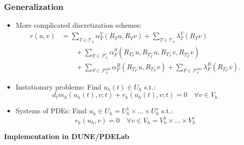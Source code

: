 \documentclass[ignorenonframetext,11pt]{beamer}
\theoremstyle{definition}
\begin{document}
\begin{frame}
\frametitle{Generalization}
\begin{itemize}
\item More complicated discretization schemes:
\begin{equation*}
\begin{split}
r(u,v) &= 
\sum_{T\in\mathcal{T}_h} \alpha_T^V(R_T u, R_T v) 
+ \sum_{T\in\mathcal{T}_h} \lambda_T^V(R_T v) \\
&\qquad+ \sum_{F\in\mathcal{F}_h^i} \alpha_F^S(R_{T_F^-} u,R_{T_F^+} u, R_{T_F^-} v, R_{T_F^+} v)\\
&\qquad+ \sum_{F\in\mathcal{F}_h^{\partial\Omega}} \alpha_F^B(R_{T_F^-} u, R_{T_F^-} v)
+ \sum_{F\in\mathcal{F}_h^{\partial\Omega}} \lambda_F^B(R_{T_F^-} v) .
\end{split}
\end{equation*}
\item Instationary problems: Find $u_h(t)\in U_h$ s.t.:
\begin{equation*}
d_t m_h(u_h(t),v;t) + r_h(u_h(t),v;t) = 0 
\quad \forall v\in V_h
\end{equation*}
\item Systems of PDEs: Find $u_h\in U_h=U_h^1\times \ldots \times U_h^s$ s.t.:
\begin{equation*}
r_h(u_h,v)=0 
\quad \forall v\in V_h=V_h^1\times\ldots\times V_h^s
\end{equation*}
\end{itemize}
\end{frame}


\begin{frame}
\begin{center}
\Large\textbf{Implementation in DUNE/PDELab}
\end{center}
\end{frame}
\end{document}
